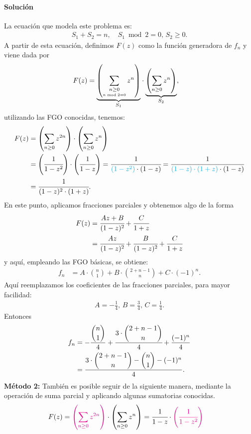 \paragraph{Solución}
La ecuación que modela este problema es:
\begin{align*}
S_1 + S_2 = n,\quad S_1\bmod 2=0,\, S_2\geq0.
\end{align*}
A partir de esta ecuación, definimos $F(z)$ como la función generadora de $f_n$ y viene dada por
\begin{align*}
F(z)&=\underset{S_1}{\underbrace{\left(\sum_{\underset{n\bmod 2=0}{n\geq0}}z^n\right)}}\cdot\underset{S_2}{\underbrace{\left(\sum_{n\geq0}z^n\right)}},
\end{align*}
utilizando las FGO conocidas, tenemos:
\begin{align*}
F(z)&=\left(\sum_{n\geq0}z^{2n}\right)\cdot\left(\sum_{n\geq 0}z^n\right)\\
&=\left(\cfrac{1}{1-z^2}\right)\cdot\left(\cfrac{1}{1-z}\right)=\cfrac{1}{{\color{cyan}(1-z^2)}\cdot(1-z)}=\cfrac{1}{{\color{cyan}(1-z)\cdot(1+z)}\cdot(1-z)}\\
&=\cfrac{1}{(1-z)^2\cdot(1+z)}.
\end{align*}
En este punto, aplicamos fracciones parciales y obtenemos algo de la forma
\begin{align*}
F(z)&=\cfrac{Az+B}{(1-z)^2}+\cfrac{C}{1+z}\\
&=\cfrac{Az}{(1-z)^2}+\cfrac{B}{(1-z)^2}+\cfrac{C}{1+z}
\end{align*}
y aquí, empleando las FGO básicas, se obtiene:
\begin{align*}
f_n&=A\cdot \binom{n}{1} + B\cdot\binom{2+n-1}{n} +C\cdot (-1)^n.
\end{align*}
Aquí reemplazamos los coeficientes de las fracciones parciales, para mayor facilidad:
\begin{align*}
A=-\frac{1}{4},\,B=\frac{3}{4},\,C=\frac{1}{4}.
\end{align*}
Entonces
\begin{align*}
f_n&=-\frac{\dbinom{n}{1}}{4}  + \cfrac{3\cdot\dbinom{2+n-1}{n}}{4} +\frac{(-1)^n}{4}\\
&=\frac{3\cdot\dbinom{2+n-1}{n}-\dbinom{n}{1}-(-1)^n}{4}.
\end{align*}
\textbf{Método 2:}
También es posible seguir de la siguiente manera, mediante la operación de suma parcial y aplicando algunas sumatorias conocidas.
\begin{align*}
F(z)&={\color{magenta}\left(\sum_{n\geq0}z^{2n}\right)}\cdot\left(\sum_{n\geq 0}z^n\right)=
\cfrac{1}{1-z}\cdot{\color{magenta} \left(\cfrac{1}{1-z^2}\right)}
\end{align*}
